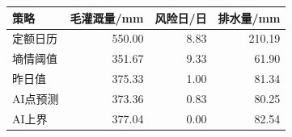 \begin{tabular}{lrrr}
\toprule
策略 & 毛灌溉量/mm & 风险日/日 & 排水量/mm \\
\midrule
定额日历 & 550.00 & 8.83 & 210.19 \\
墒情阈值 & 351.67 & 9.33 & 61.90 \\
昨日值 & 375.33 & 1.00 & 81.34 \\
AI点预测 & 373.36 & 0.83 & 80.25 \\
AI上界 & 377.04 & 0.00 & 82.54 \\
\bottomrule
\end{tabular}